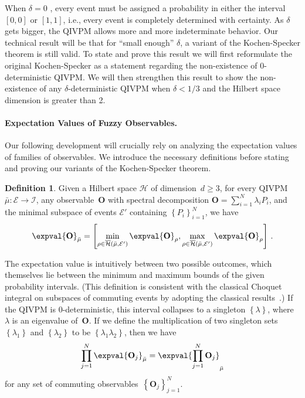 \documentclass[english,reprint, aps, prl,superscriptaddress, showpacs,
showkeys, longbibliography, amsmath, amssymb]{revtex4-1}
\theoremstyle{plain}
\theoremstyle{definition}
\newtheorem{definition}{Definition}
\newcommand{\Hilb}{\mathcal{H}}
\newcommand{\events}{\ensuremath{\mathcal{E}}}
\newcommand{\coreBorn}{\ensuremath{\overline{\Hilb}}}
\begin{document}
When $\delta=0$ , every event must be assigned a probability in either
the interval $[0,0]$ or $[1,1]$, i.e., every event is completely
determined with certainty. As $\delta$ gets bigger, the QIVPM allows
more and more indeterminate behavior. Our technical result will be
that for ``small enough'' $\delta$, a variant of the Kochen-Specker
theorem is still valid. To state and prove this result we will first
reformulate the original Kochen-Specker as a statement regarding the
non-existence of $0$-deterministic QIVPM. We will then strengthen this
result to show the non-existence of any $\delta$-deterministic QIVPM
when $\delta < 1/3$ and the Hilbert space dimension is greater than
2. 

\paragraph*{Expectation Values of Fuzzy Observables.}  Our following
development will crucially rely on analyzing the expectation values of
families of observables. We introduce the necessary definitions before
stating and proving our variants of the Kochen-Specker theorem.

\begin{definition} Given a Hilbert space $\Hilb$ of dimension~$d\ge3$,
  for every QIVPM~$\bar{\mu}:\events\rightarrow\mathscr{I}$, any
  observable~$\mathbf{O}$ with spectral decomposition
  $\mathbf{O}=\sum_{i=1}^{N}\lambda_{i}P_{i}$, and the minimal
  subspace of events $\events'$ containing
  $\left\{ P_{i}\right\} _{i=1}^{N}$, we have
\begin{equation}
\expval{\mathbf{O}}_{\bar{\mu}}=\left[\min_{\rho\in\coreBorn\left(\bar{\mu},\events'\right)}\expval{\mathbf{O}}_{\rho},\max_{\rho\in\coreBorn\left(\bar{\mu},\events'\right)}\expval{\mathbf{O}}_{\rho}\right]\,.\label{eq:quantum-interval-expectation-core}
\end{equation}
\end{definition}

The expectation value is intuitively between two possible outcomes,
which themselves lie between the minimum and maximum bounds of the
given probability intervals. (This definition is consistent with the
classical Choquet integral on subspaces of commuting events by
adopting the classical
results~\cite{GilboaSchmeidler1994,Grabisch2016}.)  If the QIVPM is
0-deterministic, this interval collapses to a singleton
$\left\{ \lambda\right\} $, where $\lambda$ is an eigenvalue
of~$\mathbf{O}$. If we define the multiplication of two singleton
sets~$\left\{ \lambda_{1}\right\} $ and $\left\{ \lambda_{2}\right\} $
to be $\left\{ \lambda_{1}\lambda_{2}\right\} $, then we have
\begin{equation}
\prod_{j=1}^{N}\expval{\mathbf{O}_{j}}_{\bar{\mu}}=\expval{\prod_{j=1}^{N}\mathbf{O}_{j}}_{\bar{\mu}}\label{eq:Kochen-Specker-Rules}
\end{equation}
for any set of commuting observables~$\left\{ \mathbf{O}_{j}\right\}
_{j=1}^{N}$.
\end{document}
